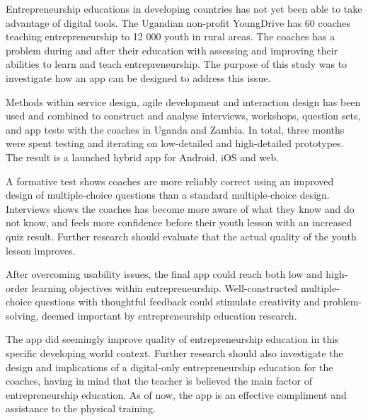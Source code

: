 
Entrepreneurship educations in developing countries has not yet been able to take advantage of digital tools. The Ugandian non-profit YoungDrive has 60 coaches teaching entrepreneurship to 12 000 youth in rural areas. The coaches has a problem during and after their education with assessing and improving their abilities to learn and teach entrepreneurship. The purpose of this study was to investigate how an app can be designed to address this issue.

Methods within service design, agile development and interaction design has been used and combined to construct and analyse interviews, workshops, question sets, and app tests with the coaches in Uganda and Zambia. In total, three months were spent testing and iterating on low-detailed and high-detailed prototypes. The result is a launched hybrid app for Android, iOS and web.

A formative test shows coaches are more reliably correct using an improved design of multiple-choice questions than a standard multiple-choice design. Interviews shows the coaches has become more aware of what they know and do not know, and feels more confidence before their youth lesson with an increased quiz result. Further research should evaluate that the actual quality of the youth lesson improves.

After overcoming usability issues, the final app could reach both low and high-order learning objectives within entrepreneurship. Well-constructed multiple-choice questions with thoughtful feedback could stimulate creativity and problem-solving, deemed important by entrepreneurship education research.

The app did seemingly improve quality of entrepreneurship education in this specific developing world context. Further research should also investigate the design and implications of a digital-only entrepreneurship education for the coaches, having in mind that the teacher is believed the main factor of entrepreneurship education. As of now, the app is an effective compliment and assistance to the physical training.

